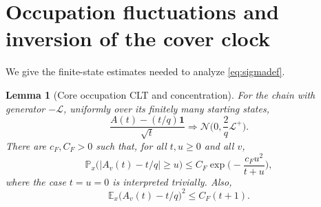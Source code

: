 \documentclass[11pt]{amsart}
\newtheorem{lemma}[theorem]{Lemma}
\theoremstyle{remark}
\numberwithin{equation}{section}
\newcommand{\E}{\mathbb{E}}
\newcommand{\Prob}{\mathbb{P}}
\newcommand{\bone}{\mathbf{1}}
\newcommand{\Lap}{\mathcal{L}}
\newcommand{\Nor}{\mathcal{N}}
\begin{document}
\section{Occupation fluctuations and inversion of the cover clock}\label{sec:occupation}

We give the finite-state estimates needed to analyze \eqref{eq:sigmadef}.

\begin{lemma}[Core occupation CLT and concentration]\label{lem:occupation}
For the chain with generator $-\Lap$, uniformly over its finitely many starting states,
\begin{equation}\label{eq:occclt}
\frac{A(t)-(t/q)\bone}{\sqrt t}\Longrightarrow\Nor\Big(0,\frac2q\Lap^+\Big).
\end{equation}
There are $c_F,C_F>0$ such that, for all $t,u\ge 0$ and all $v$,
\begin{equation}\label{eq:occtail}
\Prob_x\big(|A_v(t)-t/q|\ge u\big)\le C_F\exp\Big(-\frac{c_Fu^2}{t+u}\Big),
\end{equation}
where the case $t=u=0$ is interpreted trivially. Also,
\begin{equation}\label{eq:occsecond}
\E_x\big(A_v(t)-t/q\big)^2\le C_F(t+1).
\end{equation}
\end{lemma}
\end{document}
